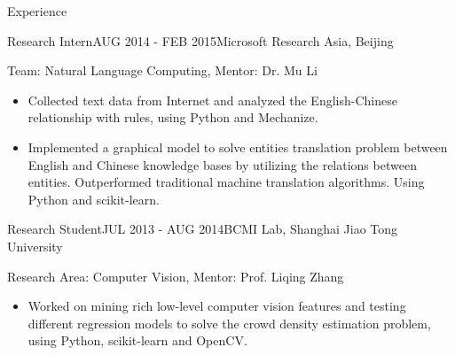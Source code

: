 \documentclass{resume} %
\begin{document}
\begin{rSection}{Experience}
\begin{rSubsection}{Research Intern}{AUG 2014 - FEB 2015}{Microsoft Research Asia, Beijing}

Team: Natural Language Computing, Mentor: Dr. Mu Li
\begin{itemize}
\item Collected text data from Internet and analyzed the English-Chinese relationship with rules, using Python and Mechanize.
\item Implemented a graphical model to solve entities translation problem between English and Chinese knowledge bases by utilizing the relations between entities. Outperformed traditional machine translation algorithms. Using Python and scikit-learn.
\end{itemize}
\end{rSubsection}
\vspace{5pt}
\begin{rSubsection}{Research Student}{JUL 2013 - AUG 2014}{BCMI Lab, Shanghai Jiao Tong University}

Research Area: Computer Vision, Mentor: Prof. Liqing Zhang
\begin{itemize}
\item Worked on mining rich low-level computer vision features and testing different regression models to solve the crowd density estimation problem, using Python, scikit-learn and OpenCV.
\end{itemize}
\end{rSubsection}
\end{rSection}
\end{document}
